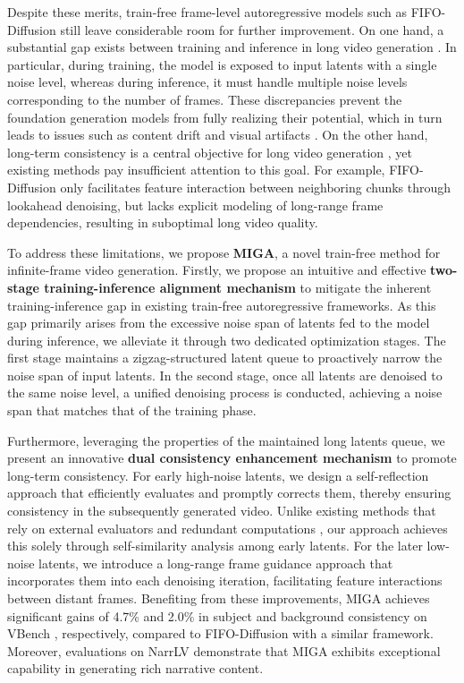 \documentclass{article}
\theoremstyle{plain}
\theoremstyle{definition}
\theoremstyle{remark}
\begin{document}
Despite these merits, train-free frame-level autoregressive models such as FIFO-Diffusion still leave considerable room for further improvement.
On one hand, a substantial gap exists between training and inference in long video generation \cite{kim2024fifo}. 
In particular, during training, the model is exposed to input latents with a single noise level, whereas during inference, it must handle multiple noise levels corresponding to the number of frames.
These discrepancies prevent the foundation generation models from fully realizing their potential, which in turn leads to issues such as content drift and visual artifacts \cite{cai2025mixture}.
On the other hand, long-term consistency is a central objective for long video generation \cite{henschel2025streamingt2v, yang2025scalingnoise}, yet existing methods pay insufficient attention to this goal.
For example, FIFO-Diffusion only facilitates feature interaction between neighboring chunks through lookahead denoising, but lacks explicit modeling of long-range frame dependencies, resulting in suboptimal long video quality.


To address these limitations, we propose \textbf{MIGA}, a novel train-free method for infinite-frame video generation. Firstly, we propose an intuitive and effective \textbf{two-stage training-inference alignment mechanism} to mitigate the inherent training-inference gap in existing train-free autoregressive frameworks. 
As this gap primarily arises from the excessive noise span of latents fed to the model during inference, we alleviate it through two dedicated optimization stages.
The first stage maintains a zigzag-structured latent queue to proactively narrow the noise span of input latents. 
In the second stage, once all latents are denoised to the same noise level, a unified denoising process is conducted, achieving a noise span that matches that of the training phase.

Furthermore, leveraging the properties of the maintained long latents queue, we present an innovative \textbf{dual consistency enhancement mechanism} to promote long-term consistency. 
For early high-noise latents, we design a self-reflection approach that efficiently evaluates and promptly corrects them, thereby ensuring consistency in the subsequently generated video.
Unlike existing methods that rely on external evaluators and redundant computations \cite{yang2025scalingnoise,he2025scaling}, our approach achieves this solely through self-similarity analysis among early latents. For the later low-noise latents, we introduce a long-range frame guidance approach that incorporates them into each denoising iteration, facilitating feature interactions between distant frames.
Benefiting from these improvements, MIGA achieves significant gains of 4.7\% and 2.0\% in subject and background consistency on VBench \cite{huang2024vbench}, respectively, compared to FIFO-Diffusion with a similar framework. Moreover, evaluations on NarrLV \cite{feng2025narrlv} demonstrate that MIGA exhibits exceptional capability in generating rich narrative content.
\end{document}
